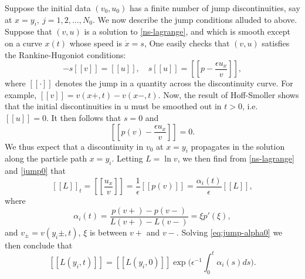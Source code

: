 \documentclass[a4paper,oneside,11pt]{article}
\numberwithin{equation}{section}
\begin{document}
Suppose the initial data $(v_0, u_0)$ has a finite number of jump discontinuities, say at $x=y_i,~j=1,2,\dots,N_0$.
We now describe the jump conditions alluded to above. Suppose that \((v, u)\) is a solution to \eqref{ns-lagrange}, and which is smooth except on a curve \(x(t)\) whose speed is \(\dot{x}=s\), 
One easily checks that $(v, u)$ satisfies the Rankine-Hugoniot conditions:
\begin{equation}\label{rh-conditon1}
	-s[\![v]\!]=[\![u]\!], \quad s[\![u]\!]=[\![p - \frac{\epsilon u_{x}}{v}]\!],
\end{equation}
where $[\![\cdot]\!]$ denotes the jump in a quantity across the discontinuity curve. For example, $[\![v]\!] = v(x+, t) - v(x-, t)$. 
Now, the result of Hoff-Smoller \cite[Theorem 4.2]{hs1985} shows that the initial discontinuities in $u$ must be smoothed out in ${t >0}$, i.e.
$[\![u]\!] = 0$. It then follows that $s = 0$ and
\begin{equation}\label{jump0}
	[\![p(v) - \frac{\epsilon u_{x}}{v}]\!]=0.
\end{equation}
We thus expect that a discontinuity in $v_0$ at $x = y_i$ propagates in the solution along the particle path $x = y_i$.
Letting \(L = \ln v\), we then find from \eqref{ns-lagrange} and \eqref{jump0} that
\begin{equation}\label{eq:jump-alpha0}
{[\![   L]\!]  }_{t} = [\![  \frac{{u}_{x}}{v}]\!]   = \frac{1}{\epsilon }[\![  {p( {v}) }]\!]   = \frac{\alpha_i(t)}{\epsilon }[\![  L]\!],
\end{equation}
where 
\begin{equation}\label{eq:jump-alpha1}
 \alpha_i(t)=%
 \frac{p(v+)-p(v-)}{L(v+)-L(v-)}=\xi p'(\xi),
\end{equation}
and \({v}_{ \pm  } = v( {y_i\pm ,t}) \), $\xi$ is between $v+$ and $v-$.
Solving \eqref{eq:jump-alpha0} we then conclude that
\begin{equation}\label{eq:jump-alpha2}
[\![  {L( {y_i,t}) }]\!]   = [\![  {L( {y_i,0}) }]\!]  \exp \Big( {{\epsilon }^{-1}\int_{0}^{t}\alpha_i (s) {ds}}\Big).
\end{equation}
\end{document}
